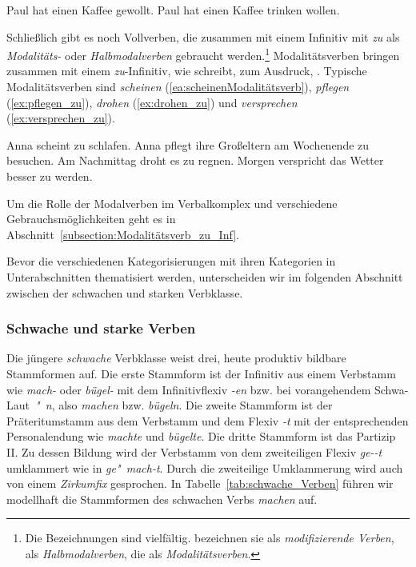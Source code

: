 \ea \label{ea:MV_VV_PII}
\ea \label{ea:VV_hat_gewollt} Paul hat einen Kaffee gewollt.
\ex \label{ex:MV_hat_trinken_wollen} Paul hat einen Kaffee trinken wollen.
\z
\z 

Schließlich gibt es noch Vollverben, die zusammen mit einem Infinitiv mit \textit{zu} als \textit{Modalitäts-} oder \textit{Halbmodalverben} gebraucht werden.\footnote{Die Bezeichnungen sind vielfältig. \citet[45]{HelbigBuscha} bezeichnen sie als \textit{modifizierende Verben}, \citet[391--392]{Eisenberg2020_Satz} als \textit{Halbmodalverben}, die \citet[639]{Duden2022} als \textit{Modalitätsverben}.} Modalitätsverben bringen zusammen mit einem \textit{zu}-Infinitiv, wie \citet[236]{Diewald2004} schreibt, zum Ausdruck, . Typische Modalitätsverben sind \textit{scheinen} (\ref{ea:scheinenModalitätsverb}), \textit{pflegen} (\ref{ex:pflegen_zu}), \textit{drohen} (\ref{ex:drohen_zu}) und \textit{versprechen} (\ref{ex:versprechen_zu}).

\ea \label{Modalitätsverb}
\ea \label{ea:scheinenModalitätsverb} Anna scheint zu schlafen.
\ex \label{ex:pflegen_zu} Anna pflegt ihre Großeltern am Wochenende zu besuchen.
\ex \label{ex:drohen_zu} Am Nachmittag droht es zu regnen.
\ex \label{ex:versprechen_zu} Morgen verspricht das Wetter besser zu werden.
\z 
\z 

Um die Rolle der Modalverben im Verbalkomplex und verschiedene Gebrauchsmöglichkeiten geht es in Abschnitt~\ref{subsection:Modalitätsverb_zu_Inf}.


Bevor die verschiedenen Kategorisierungen mit ihren Kategorien in Unterabschnitten thematisiert werden, unterscheiden wir im folgenden Abschnitt zwischen der schwachen und starken Verbklasse.

\subsubsection{Schwache und starke Verben}\label{subsubsection:stark_schwach}

Die jüngere \textit{schwache} Verbklasse weist drei, heute produktiv bildbare Stammformen auf. Die erste Stammform ist der Infinitiv aus einem Verbstamm wie \textit{mach-} oder \textit{bügel-} mit dem Infinitivflexiv \textit{-en} bzw. bei vorangehendem Schwa-Laut~\textit{"~n}, also \textit{machen} bzw. \textit{bügeln}. Die zweite Stammform ist der Präteritumstamm aus dem Verbstamm und dem Flexiv \textit{-t} mit der entsprechenden Personalendung wie \textit{machte} und \textit{bügelte}. Die dritte Stammform ist das Partizip II. Zu dessen Bildung wird der Verbstamm von dem zweiteiligen Flexiv \textit{ge-}\textit{-t} umklammert wie in \textit{ge"~}\textit{mach}\textit{-t}. Durch die zweiteilige Umklammerung wird auch von einem \textit{Zirkumfix} gesprochen. In Tabelle~\ref{tab:schwache_Verben} führen wir modellhaft die Stammformen des schwachen Verbs \textit{machen} auf. 

